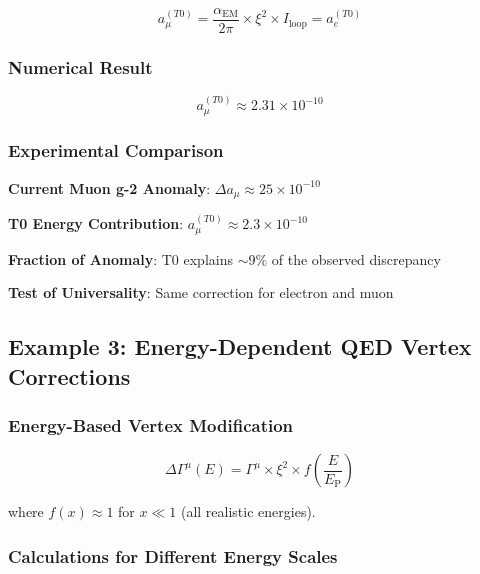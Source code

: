 \documentclass[12pt,a4paper]{article}
\newcommand{\alphaEM}{\alpha_{\text{EM}}}
\newcommand{\EP}{E_{\text{P}}}
\newcommand{\xipar}{\xi}
\begin{document}
	\begin{equation}
		a_{\mu}^{(T0)} = \frac{\alphaEM}{2\pi} \times \xipar^2 \times I_{\text{loop}} = a_e^{(T0)}
		\label{eq:muon_g2_universality}
	\end{equation}
	
	\subsubsection{Numerical Result}
	\begin{equation}
		a_{\mu}^{(T0)} \approx 2.31 \times 10^{-10}
		\label{eq:muon_g2_result}
	\end{equation}
	
	\subsubsection{Experimental Comparison}
	\begin{tcolorbox}[colback=blue!5!white,colframe=blue!75!black,title=Muon g-2 Energy Prediction]
		\textbf{Current Muon g-2 Anomaly}: $\Delta a_{\mu} \approx 25 \times 10^{-10}$
		
		\textbf{T0 Energy Contribution}: $a_{\mu}^{(T0)} \approx 2.3 \times 10^{-10}$
		
		\textbf{Fraction of Anomaly}: T0 explains $\sim 9\%$ of the observed discrepancy
		
		\textbf{Test of Universality}: Same correction for electron and muon
	\end{tcolorbox}
	
	\subsection{Example 3: Energy-Dependent QED Vertex Corrections}
	\label{subsec:qed_vertex_energy}
	
	\subsubsection{Energy-Based Vertex Modification}
	\begin{equation}
		\Delta\Gamma^{\mu}(E) = \Gamma^{\mu} \times \xipar^2 \times f\left(\frac{E}{\EP}\right)
		\label{eq:vertex_energy_correction}
	\end{equation}
	
	where $f(x) \approx 1$ for $x \ll 1$ (all realistic energies).
	
	\subsubsection{Calculations for Different Energy Scales}
	
\end{document}

